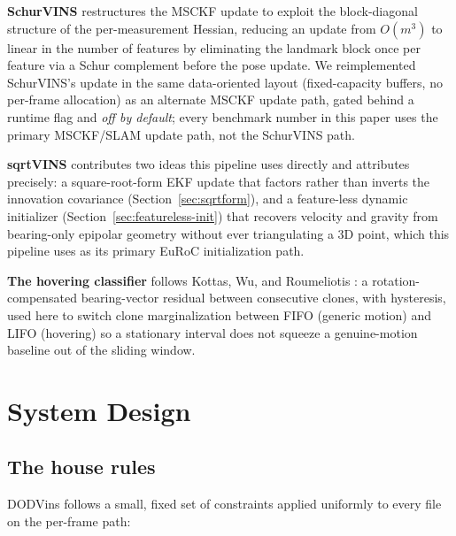 \documentclass[10pt,conference,letterpaper]{IEEEtran}
\begin{document}
\textbf{SchurVINS} \cite{fan2024schurvins} restructures the MSCKF update to
exploit the block-diagonal structure of the per-measurement Hessian, reducing
an update from $O(m^3)$ to linear in the number of features by eliminating
the landmark block once per feature via a Schur complement before the pose
update. We reimplemented SchurVINS's update in the same data-oriented layout
(fixed-capacity buffers, no per-frame allocation) as an alternate MSCKF
update path, gated behind a runtime flag and \emph{off by default}; every
benchmark number in this paper uses the primary MSCKF/SLAM update path, not
the SchurVINS path.

\textbf{sqrtVINS} \cite{peng2025sqrtvins} contributes two ideas this
pipeline uses directly and attributes precisely: a square-root-form EKF
update that factors rather than inverts the innovation covariance
(Section~\ref{sec:sqrtform}), and a feature-less dynamic initializer
(Section~\ref{sec:featureless-init}) that recovers velocity and gravity from
bearing-only epipolar geometry without ever triangulating a 3D point, which
this pipeline uses as its primary EuRoC initialization path.

\textbf{The hovering classifier} follows Kottas, Wu, and Roumeliotis
\cite{kottas2013hover}: a rotation-compensated bearing-vector residual
between consecutive clones, with hysteresis, used here to switch clone
marginalization between FIFO (generic motion) and LIFO (hovering) so a
stationary interval does not squeeze a genuine-motion baseline out of the
sliding window.

\section{System Design}

\subsection{The house rules}
\label{sec:rules}

DODVins follows a small, fixed set of constraints applied
uniformly to every file on the per-frame path:
\end{document}
